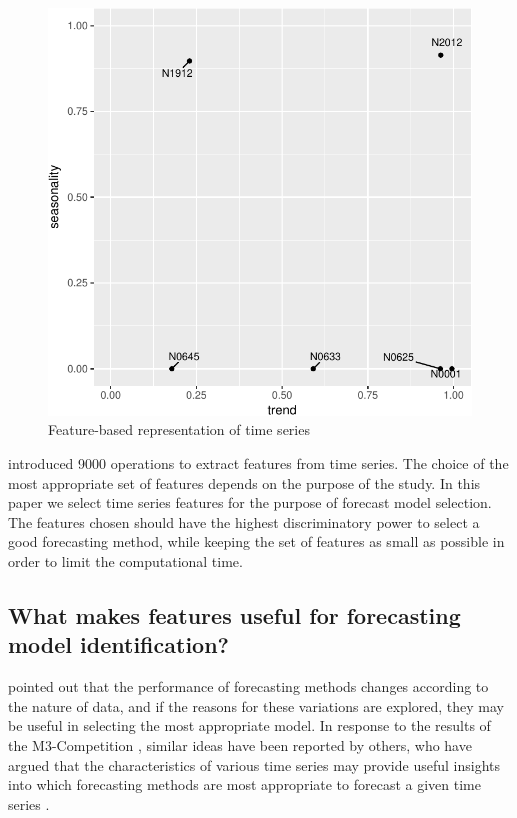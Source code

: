 \documentclass[11pt,a4paper,]{article}
\theoremstyle{definition}
\theoremstyle{definition}
\theoremstyle{definition}
\theoremstyle{remark}
\begin{document}
\begin{figure}

{\centering \includegraphics[width=0.7\linewidth]{figure/fig2-1} 

}

\caption{Feature-based representation of time series}\label{fig:fig2}
\end{figure}

\textcite{fulcher2014highly} introduced 9000 operations to extract
features from time series. The choice of the most appropriate set of
features depends on the purpose of the study. In this paper we select
time series features for the purpose of forecast model selection. The
features chosen should have the highest discriminatory power to select a
good forecasting method, while keeping the set of features as small as
possible in order to limit the computational time.

\subsection{What makes features useful for forecasting model
identification?}\label{what-makes-features-useful-for-forecasting-model-identification}

\textcite{reid1972comparison} pointed out that the performance of
forecasting methods changes according to the nature of data, and if the
reasons for these variations are explored, they may be useful in
selecting the most appropriate model. In response to the results of the
M3-Competition \autocite{makridakis2000m3}, similar ideas have been
reported by others, who have argued that the characteristics of various
time series may provide useful insights into which forecasting methods
are most appropriate to forecast a given time series
\autocites{hyndman2001s}{lawrence2001s}{armstrong2001s}.
\end{document}
